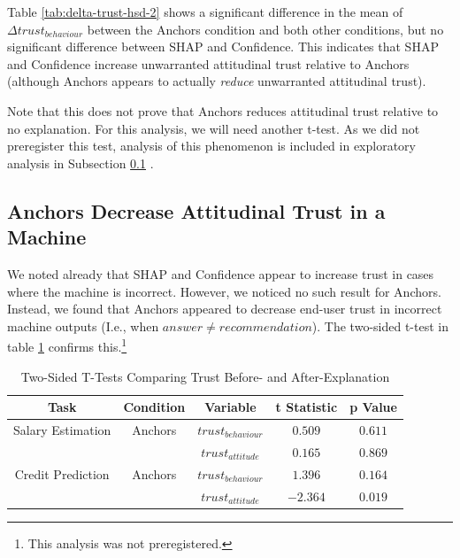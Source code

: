 Table \ref{tab:delta-trust-hsd-2} shows a significant difference in the mean of $\Delta trust_{behaviour}$ between the Anchors condition and both other conditions, but no significant difference between SHAP and Confidence. This indicates that SHAP and Confidence increase unwarranted attitudinal trust relative to Anchors (although Anchors appears to actually \emph{reduce} unwarranted attitudinal trust).

Note that this does not prove that Anchors reduces attitudinal trust relative to no explanation. For this analysis, we will need another t-test. As we did not preregister this test, analysis of this phenomenon is included in exploratory analysis in Subsection \ref{ssec:anchors-decrease} \cite{natarajan_binns_2022}.

\subsection{Anchors Decrease Attitudinal Trust in a Machine}\label{ssec:anchors-decrease}
We noted already that SHAP and Confidence appear to increase trust in cases where the machine is incorrect. However, we noticed no such result for Anchors. Instead, we found that Anchors appeared to decrease end-user trust in incorrect machine outputs (I.e., when $answer \neq recommendation$). The two-sided t-test in table \ref{tab:delta-trust-t-2} confirms this.\footnote{This analysis was not preregistered.}

\begin{table}[htbp]
    \caption{Two-Sided T-Tests Comparing Trust Before- and After-Explanation}
    \begin{center}
    \begin{tabular}{ccccc}
        \toprule
        Task & Condition & Variable & t Statistic & p Value \\ 
        \midrule
        Salary Estimation & Anchors & $trust_{behaviour}$ & $0.509$ & $0.611$ \\
        & & $trust_{attitude}$ & $0.165$ & $0.869$ \\
        \midrule
        Credit Prediction & Anchors & $trust_{behaviour}$ & $1.396$ & $0.164$ \\
        & & $trust_{attitude}$ & $\mathbf{-2.364}$ & $\mathbf{0.019}$ \\
        \bottomrule
    \end{tabular}
    \label{tab:delta-trust-t-2}
    \end{center}
\end{table}


